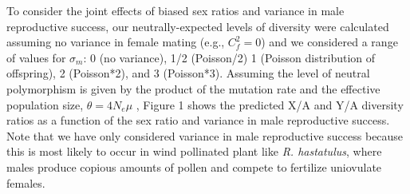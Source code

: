 \documentclass[9pt,twocolumn,twoside]{gsajnl}
\begin{document}
To consider the joint effects of biased sex ratios and variance in male reproductive success, our neutrally-expected levels of diversity were calculated assuming no variance in female mating (e.g., $C^2_{f}=0$) and we considered a range of values for $\sigma_{m}$: 0 (no variance), 1/2 (Poisson/2) 1 (Poisson distribution of offspring), 2 (Poisson*2), and 3 (Poisson*3). Assuming the level of neutral polymorphism is given by the product of the mutation rate and the effective population size, $\theta=4N_{e}\mu$ \citep{watterson1975,kimura1984}, Figure 1 shows the predicted X/A and Y/A diversity ratios as a function of the sex ratio and variance in male reproductive success. Note that we have only considered variance in male reproductive success because this is most likely to occur in wind pollinated plant like \textit{R. hastatulus}, where males produce copious amounts of pollen and compete to fertilize uniovulate females.











\end{document}
